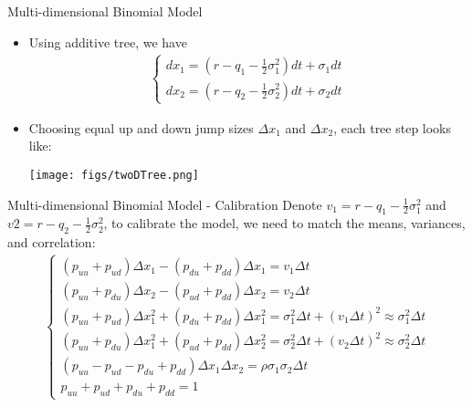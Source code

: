 \begin{frame}{Multi-dimensional Binomial Model}
\begin{itemize}
\item Using additive tree, we have
\begin{align}
\begin{cases}
d x_1 = (r - q_1 - \frac12 \sigma_1^2) dt + \sigma_1 dt \\
d x_2 = (r - q_2 - \frac12 \sigma_2^2) dt + \sigma_2 dt
\end{cases}
\end{align}
\item Choosing equal up and down jump sizes $\Delta x_1$ and $\Delta x_2$, each tree step looks like:
\vspace{3mm}
\begin{center}
\texttt{[image: figs/twoDTree.png]}
\end{center}
\end{itemize}
\end{frame}

\begin{frame}{Multi-dimensional Binomial Model - Calibration}
Denote $v_1 = r - q_1 - \frac12 \sigma_1^2$ and $v2 = r - q_2 - \frac12 \sigma_2^2$, to calibrate the model, we need to match the means, variances, and correlation:
\begin{align}
\begin{cases}
(p_{uu} + p_{ud}) \Delta x_1 - (p_{du} + p_{dd}) \Delta x_1 = v_1 \Delta t \\
(p_{uu} + p_{du}) \Delta x_2 - (p_{ud} + p_{dd}) \Delta x_2 = v_2 \Delta t \\
(p_{uu} + p_{ud}) \Delta x_1^2 + (p_{du} + p_{dd}) \Delta x_1^2 = \sigma_1^2 \Delta t + (v_1 \Delta t)^2 \approx \sigma_1^2 \Delta t \\
(p_{uu} + p_{du}) \Delta x_1^2 + (p_{ud} + p_{dd}) \Delta x_2^2 = \sigma_2^2 \Delta t + (v_2 \Delta t)^2 \approx \sigma_2^2 \Delta t \\
(p_{uu} - p_{ud} - p_{du} + p_{dd})\Delta x_1 \Delta x_2 = \rho \sigma_1 \sigma_2 \Delta t \\
p_{uu} + p_{ud} + p_{du} + p_{dd} = 1
\end{cases}
\end{align}
\end{frame}

